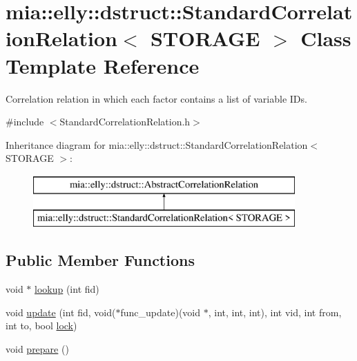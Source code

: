 \hypertarget{classmia_1_1elly_1_1dstruct_1_1_standard_correlation_relation}{\section{mia\-:\-:elly\-:\-:dstruct\-:\-:Standard\-Correlation\-Relation$<$ S\-T\-O\-R\-A\-G\-E $>$ Class Template Reference}
\label{classmia_1_1elly_1_1dstruct_1_1_standard_correlation_relation}
}


Correlation relation in which each factor contains a list of variable I\-Ds.  




{\ttfamily \#include $<$Standard\-Correlation\-Relation.\-h$>$}

Inheritance diagram for mia\-:\-:elly\-:\-:dstruct\-:\-:Standard\-Correlation\-Relation$<$ S\-T\-O\-R\-A\-G\-E $>$\-:\begin{figure}[H]
\begin{center}
\leavevmode
\includegraphics[height=2.000000cm]{classmia_1_1elly_1_1dstruct_1_1_standard_correlation_relation}
\end{center}
\end{figure}
\subsection*{Public Member Functions}
\begin{DoxyCompactItemize}
\item 
void $\ast$ \hyperlink{classmia_1_1elly_1_1dstruct_1_1_standard_correlation_relation_af6c0e4a8dfaa51adf36ff0d8d5471161}{lookup} (int fid)
\item 
void \hyperlink{classmia_1_1elly_1_1dstruct_1_1_standard_correlation_relation_a1a718cf7faf6deb3653e55e391fc97d4}{update} (int fid, void($\ast$func\-\_\-update)(void $\ast$, int, int, int), int vid, int from, int to, bool \hyperlink{classmia_1_1elly_1_1dstruct_1_1_abstract_correlation_relation_a3291f1afe2252b5bc97414a96c035505}{lock})
\item 
void \hyperlink{classmia_1_1elly_1_1dstruct_1_1_standard_correlation_relation_a97f86a53fdcef68f7ef4c13f4d3da9b4}{prepare} ()
\end{DoxyCompactItemize}
